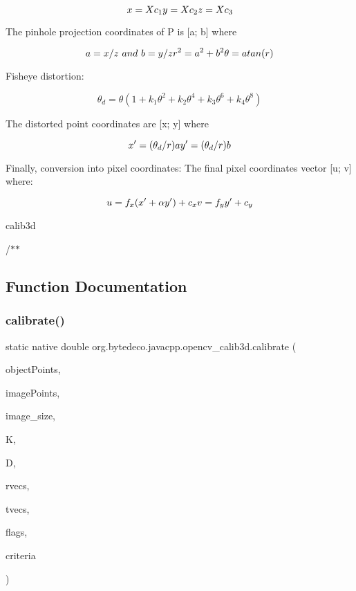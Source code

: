 \[x = Xc_1 \\ y = Xc_2 \\ z = Xc_3\] 

The pinhole projection coordinates of P is \mbox{[}a; b\mbox{]} where 

\[a = x / z \ and \ b = y / z \\ r^2 = a^2 + b^2 \\ \theta = atan(r)\] 

Fisheye distortion\+: 

\[\theta_d = \theta (1 + k_1 \theta^2 + k_2 \theta^4 + k_3 \theta^6 + k_4 \theta^8)\] 

The distorted point coordinates are \mbox{[}x\textquotesingle{}; y\textquotesingle{}\mbox{]} where 

\[x' = (\theta_d / r) a \\ y' = (\theta_d / r) b \] 

Finally, conversion into pixel coordinates\+: The final pixel coordinates vector \mbox{[}u; v\mbox{]} where\+: 

\[u = f_x (x' + \alpha y') + c_x \\ v = f_y y' + c_y\] 

calib3d 

/$\ast$$\ast$ 

\subsection{Function Documentation}
\mbox{\label{group__calib3d__fisheye_ga4fd78a3672b06b47ba34e82e17824e9d}} 
\subsubsection{\texorpdfstring{calibrate()}{calibrate()}}
{\footnotesize\ttfamily static native double org.\+bytedeco.\+javacpp.\+opencv\+\_\+calib3d.\+calibrate (\begin{DoxyParamCaption}\item[{@By\+Val Mat\+Vector}]{object\+Points,  }\item[{@By\+Val Mat\+Vector}]{image\+Points,  }\item[{@Const @By\+Ref Size}]{image\+\_\+size,  }\item[{@By\+Val Mat}]{K,  }\item[{@By\+Val Mat}]{D,  }\item[{@By\+Val Mat\+Vector}]{rvecs,  }\item[{@By\+Val Mat\+Vector}]{tvecs,  }\item[{int}]{flags,  }\item[{@By\+Val(null\+Value=\char`\"{}cv\+::\+Term\+Criteria(cv\+::\+Term\+Criteria\+::\+C\+O\+U\+NT + cv\+::\+Term\+Criteria\+::\+E\+PS, 100, D\+B\+L\+\_\+\+E\+P\+S\+I\+L\+ON)\char`\"{}) Term\+Criteria}]{criteria }\end{DoxyParamCaption})\hspace{0.3cm}{\ttfamily [static]}}



